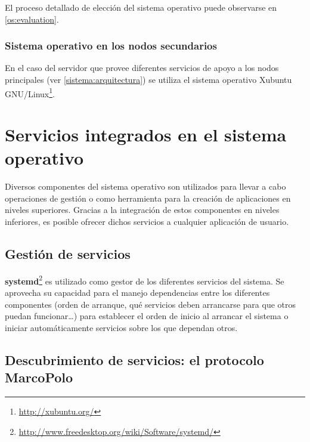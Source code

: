 
El proceso detallado de elección del sistema operativo puede observarse en \ref{os:evaluation}.
\subsubsection{Sistema operativo en los nodos secundarios}

En el caso del servidor que provee diferentes servicios de apoyo a los nodos principales (ver \ref{sistema:arquitectura}) se utiliza el sistema operativo Xubuntu GNU/Linux\footnote{\href{http://xubuntu.org/}{http://xubuntu.org/}}.%

\section{Servicios integrados en el sistema operativo}

Diversos componentes del sistema operativo son utilizados para llevar a cabo operaciones de gestión o como herramienta para la creación de aplicaciones en niveles superiores. Gracias a la integración de estos componentes en niveles inferiores, es posible ofrecer dichos servicios a cualquier aplicación de usuario. 

\subsection{Gestión de servicios}

\textbf{systemd}\footnote{\href{http://www.freedesktop.org/wiki/Software/systemd/}{http://www.freedesktop.org/wiki/Software/systemd/}} es utilizado como gestor de los diferentes servicios del sistema. Se aprovecha su capacidad para el manejo dependencias entre los diferentes componentes (orden de arranque, qué servicios deben arrancarse para que otros puedan funcionar\dots) para establecer el orden de inicio al arrancar el sistema o iniciar automáticamente servicios sobre los que dependan otros.


\subsection{Descubrimiento de servicios: el protocolo MarcoPolo}

